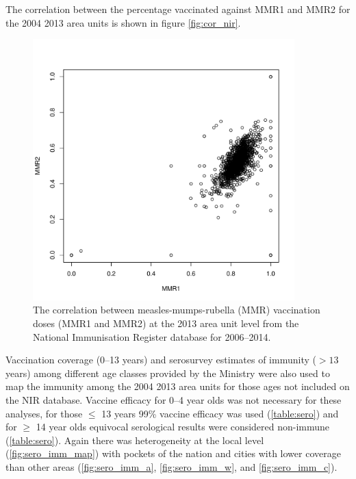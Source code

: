 \documentclass{article}
\begin{document}
The correlation between the percentage vaccinated against MMR1 and MMR2 for the 2004 2013 area units is shown in figure \autoref{fig:cor_nir}.

\begin{figure}[H]
     \begin{center}
     \includegraphics[width=0.9\textwidth]{nir_census_MMR1_NIR_cor.pdf}
     \end{center}
     \caption{The correlation between measles-mumps-rubella (MMR) vaccination doses (MMR1 and MMR2) at the 2013 area unit level from the National Immunisation Register database for 2006--2014.}
     \label{fig:cor_nir}
\end{figure}

Vaccination coverage (0--13 years) and serosurvey estimates of immunity ($>13$ years) among different age classes provided by the Ministry were also used to map the immunity among the 2004 2013 area units for those ages not included on the NIR database. Vaccine efficacy for 0--4 year olds was not necessary for these analyses, for those $\leq$ 13 years 99\% vaccine efficacy was used (\autoref{table:sero}) and for $\geq$ 14 year olds equivocal serological results were considered non-immune (\autoref{table:sero}). Again there was heterogeneity at the local level (\autoref{fig:sero_imm_map}) with pockets of the nation and cities with lower coverage than other areas (\autoref{fig:sero_imm_a}, \autoref{fig:sero_imm_w}, and \autoref{fig:sero_imm_c}).
\end{document}
